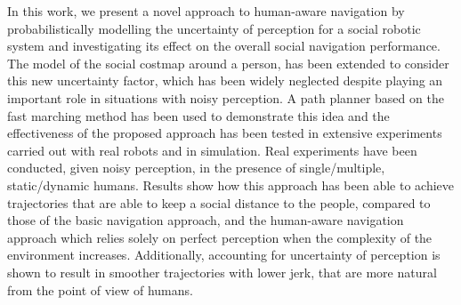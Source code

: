 In this work, we present a novel approach to human-aware navigation by probabilistically modelling the uncertainty of perception for a social robotic system and investigating its effect on the overall social navigation performance. The %
model of the social costmap around a person, has been extended to consider this new uncertainty factor, which has been widely neglected despite playing an important role in situations with noisy perception. A path planner based on the fast marching method has been used to demonstrate this idea and the effectiveness of the proposed approach has been tested in extensive experiments carried out with real robots and in simulation. Real experiments have been conducted, given noisy perception, in the presence of single/multiple, static/dynamic humans. Results show how this approach has been able to achieve trajectories that are able to keep a social distance to the people, compared to those of the basic navigation approach, and the human-aware navigation approach which relies solely on perfect perception when the complexity of the environment increases. Additionally, accounting for uncertainty of perception is shown to result in smoother trajectories with lower jerk, that are more natural from the point of view of humans. 


